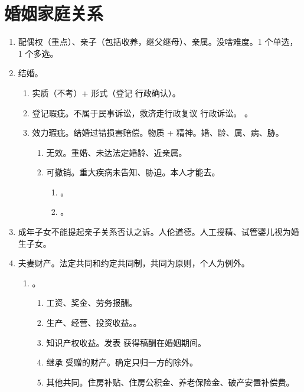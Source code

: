 \section{婚姻家庭关系}
\begin{enumerate}
  \item 配偶权（重点）、亲子（包括收养，继父继母）、亲属。没啥难度。1 个单选，1 个多选。
  \item 结婚。
        \begin{enumerate}
          \item 实质（不考）+ 形式（登记 \yjt 行政确认）。
          \item 登记瑕疵。不属于民事诉讼，救济走行政复议 \hz 行政诉讼。
                。
          \item 效力瑕疵。结婚过错损害赔偿。物质 + 精神。婚、龄、属、病、胁。
                \begin{enumerate}
                  \item 无效。重婚、未达法定婚龄、近亲属。
                  \item 可撤销。重大疾病未告知、胁迫。本人才能去。
                        \begin{enumerate}
                          \item {}。
                          \item {}。
                        \end{enumerate}
                \end{enumerate}
        \end{enumerate}
  \item 成年子女不能提起亲子关系否认之诉。人伦道德。人工授精、试管婴儿视为婚生子女。
  \item 夫妻财产。法定共同和约定共同制，共同为原则，个人为例外。
        \begin{enumerate}
          \item {}。
                \begin{enumerate}
                  \item 工资、奖金、劳务报酬。
                  \item 生产、经营、投资收益。。
                  \item 知识产权收益。发表 \hz 获得稿酬在婚姻期间。
                  \item 继承 \hz 受赠的财产。确定只归一方的除外。
                  \item 其他共同。住房补贴、住房公积金、养老保险金、破产安置补偿费。

\end{enumerate}
\end{enumerate}
\end{enumerate}
